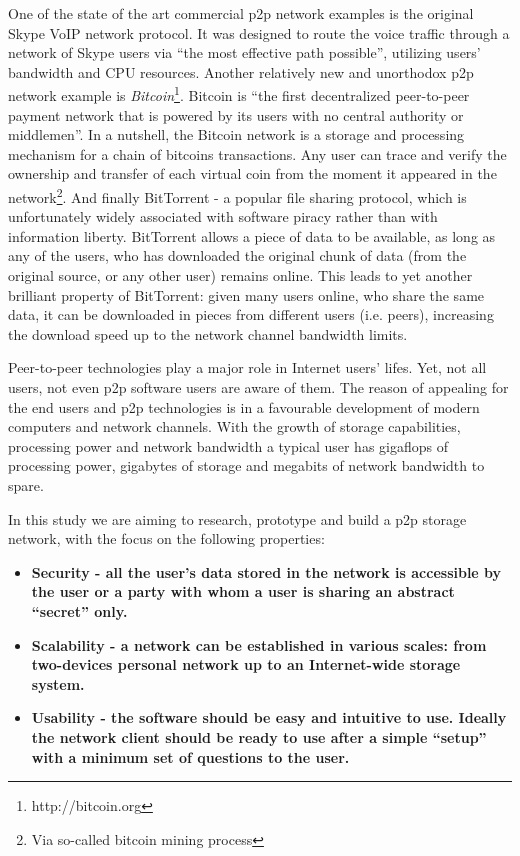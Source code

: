 One of the state of the art commercial p2p network examples is the
original Skype VoIP network protocol. It was designed to route the
voice traffic through a network of Skype users via
``the most effective path possible''\cite{skype-p2p}, utilizing
users' bandwidth and CPU resources.
Another relatively new and unorthodox p2p network example is
\emph{Bitcoin}\footnote{http://bitcoin.org}. Bitcoin is
``the first decentralized peer-to-peer payment network that
is powered by its users with no central authority or middlemen''.
In a nutshell, the Bitcoin network is a storage and processing
mechanism for a chain of bitcoins transactions. Any user can
trace and verify the ownership and transfer of each virtual
coin from the moment it appeared in the network\footnote{
Via so-called bitcoin mining process}.
And finally BitTorrent - a popular file sharing protocol, which is
unfortunately widely associated with software piracy rather than
with information liberty. BitTorrent allows a piece of data to be
available, as long as any of the users, who has downloaded the original
chunk of data (from the original source, or any other user) remains
online. This leads to yet another brilliant property of BitTorrent:
given many users online, who share the same data, it can be downloaded
in pieces from different users (i.e. peers), increasing the download
speed up to the network channel bandwidth limits.

Peer-to-peer technologies play a major role in Internet users' lifes.
Yet, not all users, not even p2p software users are aware of them.
The reason of appealing for the end users and p2p technologies
is in a favourable development of modern computers and network channels.
With the growth of storage capabilities, processing power and network
bandwidth a typical user has gigaflops of processing power, gigabytes
of storage and megabits of network bandwidth to spare.

In this study we are aiming to research, prototype and build a p2p storage
network, with the focus on the following properties:

\begin{itemize}
\item \bfseries{Security} - all the user's data stored in the network is
  accessible by the user or a party with whom a user is sharing an abstract
  ``secret'' only.
\item \bfseries{Scalability} - a network can be established in various
  scales: from two-devices personal network up to an Internet-wide storage
  system.
\item \bfseries{Usability} - the software should be easy and intuitive to
  use. Ideally the network client should be ready to use after a  simple
  ``setup'' with a minimum set of questions to the user.
\end{itemize}

